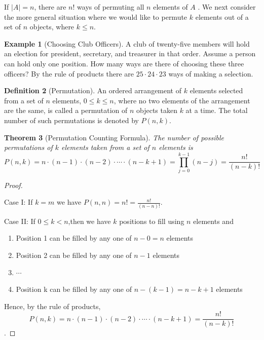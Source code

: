 \documentclass[10pt,]{book}
\theoremstyle{plain}
\newtheorem{theorem}{Theorem}[section]
\theoremstyle{definition}
\newtheorem{definition}[theorem]{Definition}
\theoremstyle{definition}
\newtheorem{example}[theorem]{Example}
\theoremstyle{definition}
\begin{document}
 If \(\lvert A \rvert = n \), there are \(n!\) ways of permuting all \(n\)  elements of \(A\) . We next consider the more general situation where we would like to permute \(k\) elements  out of a set of \(n\)  objects, where \( k \leq n\).
%
\begin{example}[Choosing Club Officers]\label{choosing-club-officers}
A club of twenty-five members will hold an election for president, secretary, and treasurer in that order. Assume a person can hold only one position. How many ways are there of choosing these three officers? By the rule of products there are \(25 \cdot 24 \cdot 23\) ways of making a selection.%
\end{example}
\begin{definition}[Permutation]\label{permutation}
 An ordered arrangement of \(k\) elements selected from a set of \(n\) elements, \(0 \leq k \leq  n\), where no two elements of the arrangement are the same, is called a permutation of \(n\) objects taken \(k\) at a time. The total number of such permutations is denoted by \(P(n, k)\).%
\end{definition}
\begin{theorem}[Permutation Counting Formula]\label{permutations-counting-formula}
 The number of possible permutations of \(k\)  elements taken from a set of \(n\)  elements is
 \begin{equation*}P(n,k)=n \cdot (n-1) \cdot (n-2) \cdot  \cdots  \cdot (n-k+1) = \prod_{j=0}^{k-1} (n-j) = \frac{n!}{(n-k)!} \end{equation*}%
\end{theorem}
\begin{proof}\hypertarget{proof-2}{}
  Case I: If \(k = m\) we have \(P(n,n)=n!=\frac{n!}{(n-n)!}\). %
\par
 Case II: If \(0 \leq  k < n\),then we have \(k\)  positions to fill using \(n\) elements and%
\par
\leavevmode%
\begin{enumerate}
\item\hypertarget{li-16}{}
 Position 1 can be filled by any one of \(n-0=n\)  elements
%
\item\hypertarget{li-17}{}
 Position 2 can be filled by any one of \(n-1\)  elements
%
\item\hypertarget{li-18}{}\( \cdots \)%
\item\hypertarget{li-19}{}
 Position k can be filled by any one of \(n-(k-1)=n-k+1\)  elements
%
\end{enumerate}
%
\par
Hence, by the rule of products, \begin{equation*}P(n,k) = n \cdot(n - 1) \cdot (n - 2) \cdot \cdots \cdot (n - k + 1) = \frac{n!}{(n-k)!}\end{equation*}. %
\end{proof}
\par
\end{document}
